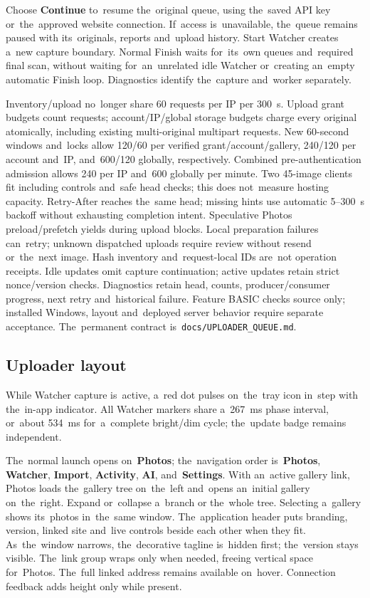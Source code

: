 \documentclass[11pt,a4paper]{article}
\newcommand{\ui}[1]{\textbf{#1}}
\begin{document}
Choose \ui{Continue} to~resume the~original queue, using the~saved API key
or~the~approved website connection. If~access is~unavailable, the~queue remains
paused with its~originals, reports and~upload history. Start Watcher creates
a~new capture boundary. Normal Finish waits for~its~own queues and~required final
scan, without waiting for~an~unrelated idle Watcher or~creating an~empty
automatic Finish loop. Diagnostics identify the~capture and~worker separately.

Inventory/upload no~longer share 60 requests per IP per 300~s.
Upload grant budgets count requests; account/IP/global storage budgets charge
every original atomically, including existing multi-original multipart requests.
New 60-second windows and~locks allow 120/60 per verified grant/account/gallery,
240/120 per account and~IP, and~600/120 globally, respectively.
Combined pre-authentication admission allows 240 per IP and~600 globally
per minute. Two 45-image clients fit including controls and~safe head checks;
this does not~measure hosting capacity. Retry-After reaches the~same head;
missing hints use automatic 5--300~s backoff without exhausting completion
intent. Speculative Photos preload/prefetch yields during upload blocks.
Local preparation failures can~retry; unknown dispatched uploads require
review without resend or~the~next image. Hash inventory and~request-local
IDs are~not operation receipts. Idle updates omit capture continuation;
active updates retain strict nonce/version checks. Diagnostics retain head,
counts, producer/consumer progress, next retry and~historical failure.
Feature BASIC checks source only; installed Windows, layout and~deployed
server behavior require separate acceptance. The~permanent contract
is~\texttt{docs/UPLOADER\_QUEUE.md}.

\subsection{Uploader layout}

While Watcher capture is~active, a~red dot pulses on~the~tray icon in~step
with the~in-app indicator. All Watcher markers share a~267~ms phase interval,
or~about 534~ms for~a~complete bright/dim cycle; the~update badge remains
independent.

The~normal launch opens on~\ui{Photos}; the~navigation order is~\ui{Photos},
\ui{Watcher}, \ui{Import}, \ui{Activity}, \ui{AI}, and~\ui{Settings}.
With an~active gallery link, Photos loads the~gallery tree on~the~left
and~opens an~initial gallery on~the~right. Expand or~collapse a~branch or
the~whole tree. Selecting a~gallery shows its~photos in~the~same window.
The~application header puts branding, version, linked site and~live controls
beside each other when they fit. As~the~window narrows, the~decorative tagline
is~hidden first; the~version stays visible. The~link group wraps only when
needed, freeing vertical space for~Photos. The~full linked address remains
available on~hover. Connection feedback adds height only while present.
\end{document}
